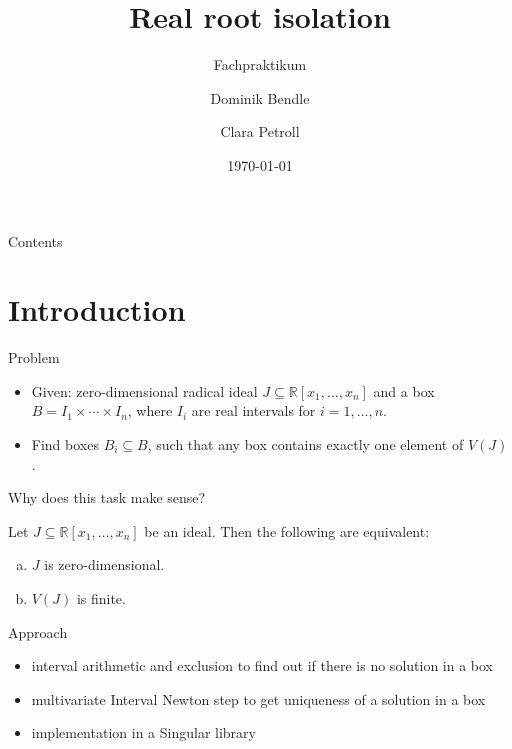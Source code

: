 \documentclass[german,10pt,xcolor=colortbl,compress]{beamer}
\title{Real root isolation}
\subtitle{Fachpraktikum}
\date{\today}
\author{Dominik Bendle \and Clara Petroll}
\institute{AG Algebra, Geometrie und Computeralgebra \\ Supervisor: Janko Böhm}
\begin{document}
\maketitle
\begin{frame}{Contents}
    \tableofcontents
\end{frame}

\section{Introduction}
\begin{frame}{Problem}
    \begin{itemize}
        \item Given: zero-dimensional radical ideal $J \subseteq \mathbb{R}[x_1, \hdots,
            x_n]$ and a box  $B=I_1 \times \cdots \times I_n$, where $I_i$ are real
            intervals for $i=1,\hdots,n$.
        \item Find boxes $B_i \subseteq B$, such that any box contains exactly one element
            of $V(J)$.
    \end{itemize}
    \pause

    Why does this task make sense?
    \begin{lemma}
        Let $J \subseteq \mathbb{R}[x_1, \hdots, x_n]$ be an ideal. Then the following are
        equivalent:
        \begin{enumerate}[a)]
            \item $J$ is zero-dimensional.
            \item $V(J)$ is finite.
        \end{enumerate}
    \end{lemma}
\end{frame}

\begin{frame}{Approach}
    \begin{itemize}
    \item interval arithmetic and exclusion to find out if there is no solution in a box
    \item multivariate Interval Newton step to get uniqueness of a solution in a box
    \item implementation in a Singular library
    \end{itemize}
\end{frame}
\end{document}
